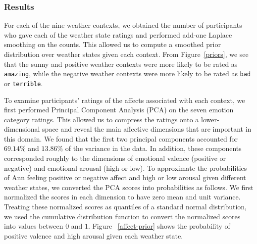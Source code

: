 \documentclass[10pt,letterpaper]{article}
\begin{document}
 
\subsubsection{Results}

For each of the nine weather contexts, we obtained the number of participants who gave each of the weather state ratings and performed add-one Laplace smoothing on the counts. This allowed us to compute a smoothed prior distribution over weather states given each context. From Figure~\ref{priors}, we see that the sunny and positive weather contexts were more likely to be rated as \texttt{amazing}, while the negative weather contexts were more likely to be rated as \texttt{bad} or \texttt{terrible}.  %

To examine participants' ratings of the affects associated with each context, we first performed Principal Component Analysis (PCA) on the seven emotion category ratings. This allowed us to compress the ratings onto a lower-dimensional space and reveal the main affective dimensions that are important in this domain. We found that the first two principal components accounted for $69.14\%$ and $13.86\%$ of the variance in the data. In addition, these components corresponded roughly to the dimensions of emotional valence (positive or negative) and emotional arousal (high or low). 
To approximate the probabilities of Ann feeling positive or negative affect and high or low arousal given different weather states, we converted the PCA scores into probabilities as follows. We first normalized the scores in each dimension to have zero mean and unit variance. Treating these normalized scores as quantiles of a standard normal distribution, we used the cumulative distribution function to convert the normalized scores into values between $0$ and $1$. Figure ~\ref{affect-prior} shows the probability of positive valence and high arousal given each weather state. 


%
\end{document}
